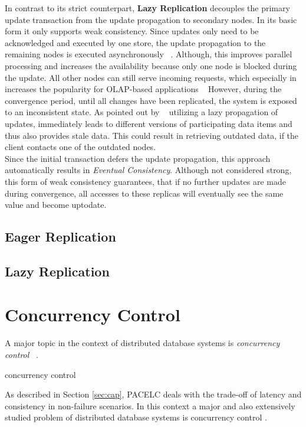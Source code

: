 In contrast to its strict counterpart, \textbf{Lazy Replication} decouples the primary update transaction from the update propagation to secondary nodes.
In its basic form it only supports weak consistency. Since updates only need to be acknowledged and executed by one store, 
the update propagation to the remaining nodes is executed asynchronously ~\cite{fekete:2018}.
Although, this improves parallel processing and increases the availability because only one node is blocked during the update. All other nodes can still serve incoming requests,
which especially in increases the popularity for OLAP-based applications ~\cite{daudjee:2006}
However, during the convergence period, until all changes have been replicated, the system is exposed to an inconsistent state.
As pointed out by ~\cite{cho:2000} utilizing a lazy propagation of updates, immediately leads to different versions of participating data items and thus also provides stale data.
This could result in retrieving outdated data, if the client contacts one of the outdated nodes.
\\
Since the initial transaction defers the update propagation, this approach automatically results in \emph{Eventual Consistency}.
Although not considered strong, this form of weak consistency guarantees, that if no further updates are made 
during convergence, all accesses to these replicas will eventually see the same value and become uptodate. ~\cite{quorums:2003}


\subsection{Eager Replication}
\subsection{Lazy Replication}




\section{Concurrency Control}
 

A major topic in the context of distributed database systems is \emph{concurrency control}~ \cite{bernstein:1981}.

concurrency control ~\cite{bernstein:1987} 

As described in Section \ref{sec:cap}, PACELC deals with the trade-off of latency and consistency in non-failure scenarios.
In this context a major and also extensively studied problem of distributed database systems is concurrency control .

